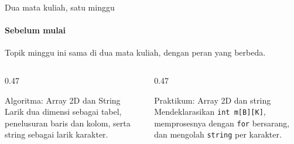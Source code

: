 \documentclass[t]{beamer}
\begin{document}

\begin{frame}{Dua mata kuliah, satu minggu}
\framesubtitle{Sebelum mulai}
Topik minggu ini sama di dua mata kuliah, dengan peran yang berbeda.
\vspace{10pt}

\begin{columns}[T]
\begin{column}{0.47\textwidth}
\begin{Blok}{Algoritma: Array 2D dan String}
Larik dua dimensi sebagai tabel, penelusuran baris dan kolom, serta string sebagai larik karakter.
\end{Blok}
\end{column}
\begin{column}{0.47\textwidth}
\begin{BlokGelap}{Praktikum: Array 2D dan string}
Mendeklarasikan \texttt{int m[B][K]}, memprosesnya dengan \texttt{for} bersarang, dan mengolah \texttt{string} per karakter.
\end{BlokGelap}
\end{column}
\end{columns}
\end{frame}
\end{document}
